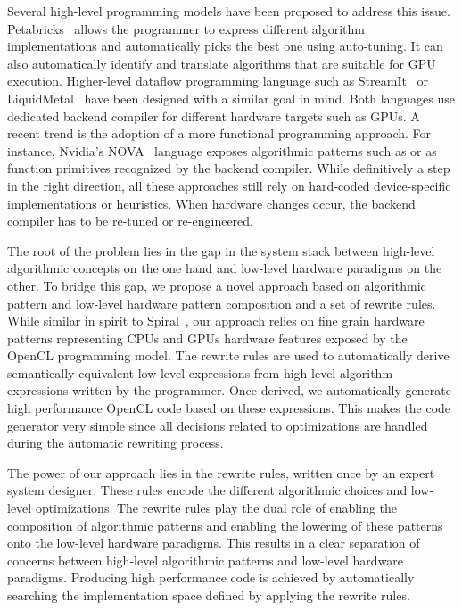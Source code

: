 Several high-level programming models have been proposed to address this issue.
Petabricks~\cite{phothilimthana13portable} allows the programmer to express different algorithm implementations and automatically picks the best one using auto-tuning.
It can also automatically identify and translate algorithms that are suitable for GPU execution.
Higher-level dataflow programming language such as StreamIt~\cite{hormati11sponge} or LiquidMetal~\cite{dubach12compiling} have been designed with a similar goal in mind.
Both languages use dedicated backend compiler for different hardware targets such as GPUs.
A recent trend is the adoption of a more functional programming approach. 
For instance, Nvidia's NOVA~\cite{collins13nova} language exposes algorithmic patterns such as  or  as function primitives recognized by the backend compiler.
While definitively a step in the right direction, all these approaches still rely on hard-coded device-specific implementations or heuristics.
When hardware changes occur, the backend compiler has to be re-tuned or re-engineered.%

The root of the problem lies in the gap in the system stack between high-level algorithmic concepts on the one hand and low-level hardware paradigms on the other.
To bridge this gap, we propose a novel approach based on algorithmic pattern and low-level hardware pattern composition and a set of rewrite rules.
While similar in spirit to Spiral~\cite{pueschel05spiral}, our approach relies on fine grain hardware patterns representing CPUs and GPUs hardware features exposed by the OpenCL programming model.
The rewrite rules are used to automatically derive semantically equivalent low-level expressions from high-level algorithm expressions written by the programmer.
Once derived, we automatically generate high performance OpenCL code based on these expressions.
This makes the code generator very simple since all decisions related to optimizations are handled during the automatic rewriting process.

The power of our approach lies in the rewrite rules, written once by an expert system designer.
These rules encode the different algorithmic choices and low-level optimizations.
The rewrite rules play the dual role of enabling the composition of algorithmic patterns and enabling the lowering of these patterns onto the low-level hardware paradigms.
This results in a clear separation of concerns between high-level algorithmic patterns and low-level hardware paradigms.
Producing high performance code is achieved by automatically searching the implementation space defined by applying the rewrite rules.

